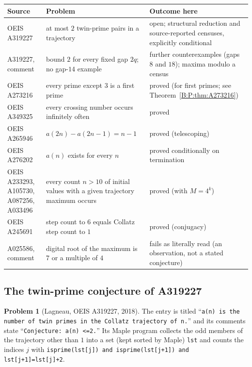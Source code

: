 \documentclass[11pt,a4paper]{article}
\theoremstyle{definition}
\newtheorem{problem}[theorem]{Problem}
\theoremstyle{remark}
\numberwithin{equation}{section}
\begin{document}
\begin{center}\small
\begin{tabular}{>{\raggedright\arraybackslash}p{}>{\raggedright\arraybackslash}p{}>{\raggedright\arraybackslash}p{}}
\toprule
Source & Problem & Outcome here\\\midrule
OEIS A319227 \cite{R009} & at most $2$ twin-prime pairs in a trajectory & open; structural reduction and source-reported censuses, explicitly conditional\\
A319227, comment & bound $2$ for every fixed gap $2q$; no gap-$14$ example & further counterexamples (gaps $8$ and $18$); maxima modulo a census\\
OEIS A273216 \cite{R040} & every prime except $3$ is a first prime & proved (for first primes; see Theorem~\ref{B:P:thm:A273216})\\
OEIS A349325 \cite{R042} & every crossing number occurs infinitely often & proved\\
OEIS A265946 \cite{R043} & $a(2n)-a(2n-1)=n-1$ & proved (telescoping)\\
OEIS A276202 \cite{R041} & $a(n)$ exists for every $n$ & proved conditionally on termination\\
OEIS A233293, A105730, A087256, A033496 \cite{R049,R050,R051,R052} & every count $n>10$ of initial values with a given trajectory maximum occurs & proved (with $M=4^k$)\\
OEIS A245691 \cite{R053} & step count to $6$ equals Collatz step count to $1$ & proved (conjugacy)\\
A025586, comment \cite{R054} & digital root of the maximum is $7$ or a multiple of $4$ & fails as literally read (an observation, not a stated conjecture)\\
\bottomrule
\end{tabular}
\end{center}

\subsection{The twin-prime conjecture of A319227}

\begin{problem}[Lagneau, OEIS A319227, 2018]\label{B:P:prob:A319227}
The entry \cite{R009} is titled ``\texttt{a(n) is the number of twin primes in the
Collatz trajectory of n.}'' and its comments state ``\texttt{Conjecture: a(n) <=2.}''
Its Maple program collects the odd members of the trajectory other than $1$ into a set (kept sorted by Maple)
\texttt{lst} and counts the indices $j$ with
\texttt{isprime(lst[j]) and isprime(lst[j+1]) and lst[j+1]=lst[j]+2}.
\end{problem}
\end{document}
